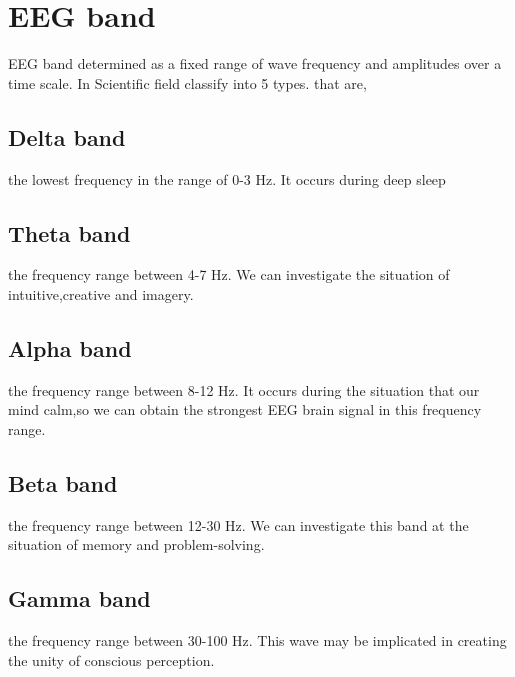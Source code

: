 \newpage
\section{EEG band}
\hspace{1.5cm}EEG band determined as a fixed range of wave frequency and amplitudes over a time scale. In Scientific field classify into 5 types. that are,

\subsection{Delta band} the lowest frequency in the range of 0-3 Hz. It occurs during deep sleep

\subsection{Theta band} the frequency range between 4-7 Hz. We can investigate the situation of intuitive,creative and imagery. 

\subsection{Alpha band} the frequency range between 8-12 Hz. It occurs during the situation that our mind calm,so we can obtain the strongest EEG brain signal in this frequency range.

\subsection{Beta band} the frequency range between 12-30 Hz. We can investigate this band at the situation of memory and problem-solving.

\subsection{Gamma band}the frequency range between 30-100 Hz. This wave may be implicated in creating the unity of conscious perception. 

